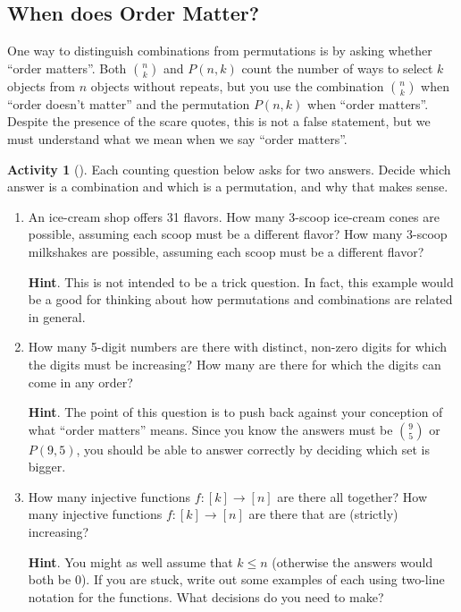 \documentclass[10pt,]{book}
\theoremstyle{plain}
\theoremstyle{definition}
\theoremstyle{definition}
\theoremstyle{definition}
\newtheorem{activity}[project]{Activity}
\theoremstyle{definition}
\numberwithin{equation}{chapter}
\begin{document}
\subsection[{When does Order Matter?}]{When does Order Matter?}\label{subsec-ordermatters}
\hypertarget{p-694}{}%
One way to distinguish combinations from permutations is by asking whether ``order matters''.  Both \(\binom{n}{k}\) and \(P(n,k)\) count the number of ways to select \(k\) objects from \(n\) objects without repeats, but you use the combination \(\binom{n}{k}\) when ``order doesn't matter'' and the permutation \(P(n,k)\) when ``order matters''.  Despite the presence of the scare quotes, this is not a false statement, but we must understand what we mean when we say ``order matters''.%
\begin{activity}[]\label{activity-59}
\hypertarget{p-695}{}%
Each counting question below asks for two answers.  Decide which answer is a combination and which is a permutation, and why that makes sense.%
\begin{enumerate}[font=\bfseries,label=(\alph*),ref=\alph*]
\item\label{task-78} \hypertarget{p-696}{}%
An ice-cream shop offers 31 flavors.  How many 3-scoop ice-cream cones are possible, assuming each scoop must be a different flavor?  How many 3-scoop milkshakes are possible, assuming each scoop must be a different flavor?%
\par\smallskip%
\noindent\textbf{Hint}.\hypertarget{hint-50}{}\quad%
\hypertarget{p-697}{}%
This is not intended to be a trick question.  In fact, this example would be a good for thinking about how permutations and combinations are related in general.%
\item\label{task-79} \hypertarget{p-698}{}%
How many 5-digit numbers are there with distinct, non-zero digits for which the digits must be increasing?  How many are there for which the digits can come in any order?%
\par\smallskip%
\noindent\textbf{Hint}.\hypertarget{hint-51}{}\quad%
\hypertarget{p-699}{}%
The point of this question is to push back against your conception of what ``order matters'' means.  Since you know the answers must be \(\binom{9}{5}\) or \(P(9,5)\), you should be able to answer correctly by deciding which set is bigger.%
\item\label{task-80} \hypertarget{p-700}{}%
How many injective functions \(f:[k] \to [n]\) are there all   together?  How many injective functions \(f:[k] \to [n]\) are there that are (strictly) increasing?%
\par\smallskip%
\noindent\textbf{Hint}.\hypertarget{hint-52}{}\quad%
\hypertarget{p-701}{}%
You might as well assume that \(k \le n\) (otherwise the answers would both be 0).  If you are stuck, write out some examples of each using two-line notation for the functions.  What decisions do you need to make?%
\end{enumerate}
\end{activity}
\end{document}
